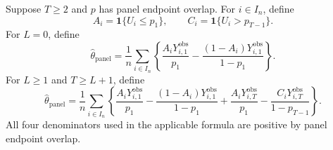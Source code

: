 Suppose \(T\ge2\) and \(p\) has panel endpoint overlap.  For \(i\in I_n\), define
\[
 A_i=\mathbf 1\{U_i\le p_1\},
 \qquad C_i=\mathbf 1\{U_i>p_{T-1}\}.
\]
For \(L=0\), define
\[
 \widehat\theta_{\mathrm{panel}}
 =\frac1n\sum_{i\in I_n}
 \left\{
 \frac{A_iY^{\mathrm{obs}}_{i,1}}{p_1}
 -\frac{(1-A_i)Y^{\mathrm{obs}}_{i,1}}{1-p_1}
 \right\}.
\]
For \(L\ge1\) and \(T\ge L+1\), define
\[
 \widehat\theta_{\mathrm{panel}}
 =\frac1n\sum_{i\in I_n}
 \left\{
 \frac{A_iY^{\mathrm{obs}}_{i,1}}{p_1}
 -\frac{(1-A_i)Y^{\mathrm{obs}}_{i,1}}{1-p_1}
 +\frac{A_iY^{\mathrm{obs}}_{i,T}}{p_1}
 -\frac{C_iY^{\mathrm{obs}}_{i,T}}{1-p_{T-1}}
 \right\}.
\]
All four denominators used in the applicable formula are positive by panel endpoint overlap.